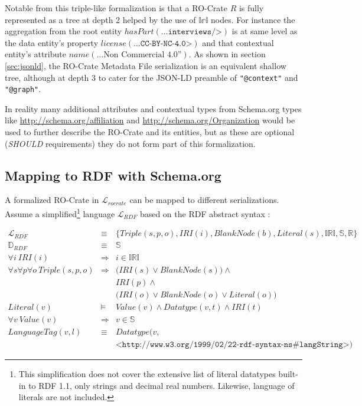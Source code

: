 Notable from this triple-like formalization is that a RO-Crate $R$ is fully represented as a tree at depth 2 helped by the use of $𝕀𝕣𝕚$ nodes. For instance the aggregation from the root entity $hasPart(\texttt{…interviews/>})$ is at same level as the data entity’s property $license(\texttt{…CC-BY-NC-4.0>})$ and that contextual entity’s attribute $ name(\text{…Non Commercial 4.0”})$. As shown in section \ref{sec:jsonld}, the RO-Crate Metadata File serialization is an equivalent shallow tree, although at depth 3 to cater for the JSON-LD preamble of \texttt{"@context"} and \texttt{"@graph"}.

In reality many additional attributes and contextual types from Schema.org types like \url{http://schema.org/affiliation} and \url{http://schema.org/Organization} would be used to further describe the RO-Crate and its entities, but as these are optional (\textit{SHOULD} requirements) they do not form part of this formalization.


\subsection{Mapping to RDF with Schema.org}

A formalized RO-Crate in $\mathcal{L}_{rocrate}$ can be mapped to different serializations.
Assume a simplified\footnote{
 This simplification does not cover the extensive list of literal datatypes built-in to RDF 1.1, only strings and decimal real numbers. Likewise, language of literals are not included.
} language $\mathcal{L}_{RDF}$
based on the RDF abstract syntax \cite{rdfworkinggroup_2014}:

\begin{eqnarray*}
\mathcal{L}_{RDF}           & \equiv &      \big\{ Triple(s,p,o), IRI(i), BlankNode(b), Literal(s),
    \mathbb{IRI}, \mathbb{S}, \mathbb{R}    \big\} \\
\mathbb{D}_{RDF}            & \equiv &      \mathbb{S} \\
\forall i \ IRI(i)          & \Rightarrow & i \in \mathbb{IRI} \\
\forall s \forall p \forall o \
    Triple(s,p,o)           & \Rightarrow & \Big( IRI(s) \lor BlankNode(s) \Big) \land  \\
                            & &             IRI(p) \land  \\
                            & &             \Big(IRI(o) \lor BlankNode(o) \lor Literal(o) \Big) \\
Literal(v)                  & \models &     Value(v) \land Datatype(v,t) \land IRI(t) \\
\forall v \ Value(v)        & \Rightarrow & v \in \mathbb{S} \\
LanguageTag(v, l)           & \equiv &      Datatype\big(v, \\
    && \texttt{<http://www.w3.org/1999/02/22-rdf-syntax-ns\#langString>}\big)
\end{eqnarray*}

